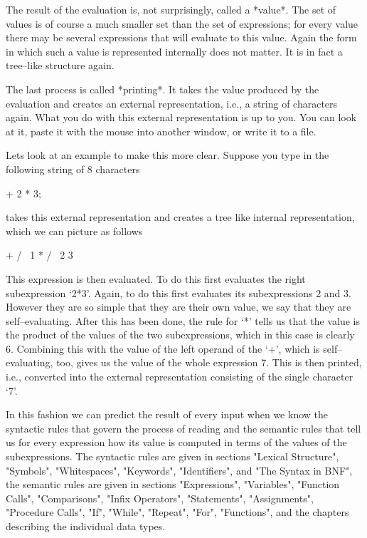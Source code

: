 The result of the evaluation is, not surprisingly, called a *value*. The
set of values  is of course a  much smaller set than the  set of
expressions; for every value there may be several expressions that will
evaluate to  this value. Again the form in which such a  value is
represented internally does not  matter. It is  in fact a tree--like
structure again.

The last process is called *printing*. It takes the value produced by
the evaluation and creates an external representation, i.e., a string of
characters again. What you do with this external representation is up to
you. You can look at it, paste it with the mouse into another window, or
write it to a file.

Lets look at an example to make this more clear. Suppose you type in the
following string of 8 characters

 + 2 * 3;
\endtt

{\GAP} takes  this external representation  and creates  a tree like
internal representation, which we can picture as follows

\begintt
  +
 / \
1   *
   / \
  2   3
\endtt

This expression is then evaluated. To do this {\GAP} first evaluates the
right subexpression `2*3'.  Again, to do this {\GAP} first evaluates its
subexpressions 2 and 3. However they are so simple that they are their
own value, we say that they are self--evaluating. After this has been
done, the rule for `*' tells us that the value is the product of the
values of the two subexpressions, which in this case is clearly 6.
Combining this with the value of the left operand of the `+', which is
self--evaluating, too, gives us the value of the whole expression 7. This
is then printed, i.e., converted into the external representation
consisting of the single character `7'.

In this fashion we can predict the result of every input when we know the
syntactic rules that govern the process of reading and the semantic rules
that tell us for every expression how its value is computed in terms of
the values of the subexpressions. The syntactic rules are given in
sections "Lexical Structure",  "Symbols", "Whitespaces", "Keywords",
"Identifiers", and "The Syntax in BNF", the semantic rules are given in
sections "Expressions", "Variables", "Function Calls", "Comparisons",
"Infix Operators",  "Statements", "Assignments", "Procedure Calls", "If",
"While", "Repeat", "For", "Functions", and the chapters describing the
individual data types.

